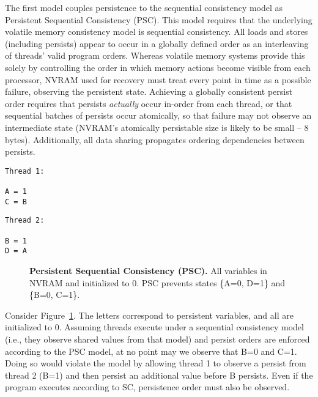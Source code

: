 The first model couples persistence to the sequential consistency model as Persistent Sequential Consistency (PSC).
This model requires that the underlying volatile memory consistency model is sequential consistency.
All loads and stores (including persists) appear to occur in a globally defined order as an interleaving of threads' valid program orders.
Whereas volatile memory systems provide this solely by controlling the order in which memory actions become visible from each processor, NVRAM used for recovery must treat every point in time as a possible failure, observing the persistent state.
Achieving a globally consistent persist order requires that persists \emph{actually} occur in-order from each thread, or that sequential batches of persists occur atomically, so that failure may not observe an intermediate state (NVRAM's atomically persistable size is likely to be small -- 8 bytes).
Additionally, all data sharing propagates ordering dependencies between persists.

{
\singlespacing
\newsavebox{\PSCThreadOne}
\begin{lrbox}{\PSCThreadOne}
  \begin{lstlisting}
Thread 1:

A = 1
C = B
  \end{lstlisting}
\end{lrbox}

\newsavebox{\PSCThreadTwo}
\begin{lrbox}{\PSCThreadTwo}
  \begin{lstlisting}
Thread 2:

B = 1
D = A
  \end{lstlisting}
\end{lrbox}

\begin{figure}[]
\centering
\subfigure{ \usebox{\PSCThreadOne} }
\hspace{1 in}
\subfigure{ \usebox{\PSCThreadTwo} }
\caption{\textbf{Persistent Sequential Consistency (PSC).} All variables in NVRAM and initialized to 0.  PSC prevents states \{A=0, D=1\} and \{B=0, C=1\}.}
\label{fig:PSC}
\end{figure}
}

Consider Figure~\ref{fig:PSC}.
The letters correspond to persistent variables, and all are initialized to 0.
Assuming threads execute under a sequential consistency model (i.e., they observe shared values from that model) and persist orders are enforced according to the PSC model, at no point may we observe that B=0 and C=1.
Doing so would violate the model by allowing thread 1 to observe a persist from thread 2 (B=1) and then persist an additional value before B persists.
Even if the program executes according to SC, persistence order must also be observed.

